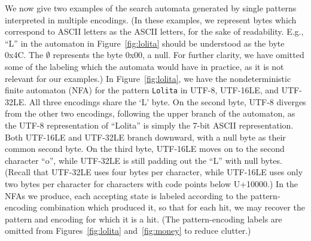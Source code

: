\documentclass[5p,final,number,sort&compress]{elsarticle}
\newcommand{\re}[1]{\texttt{#1}}
\begin{document}
We now give two examples of the search automata generated by single patterns interpreted in multiple encodings. (In these examples, we represent bytes which correspond to ASCII letters as the ASCII letters, for the sake of readability. E.g., ``L'' in the automaton in Figure~\ref{fig:lolita} should be understood as the byte 0x4C. The $\emptyset$ represents the byte 0x00, a null. For further clarity, we have omitted some of the labeling which the automata would have in practice, as it is not relevant for our examples.) In Figure~\ref{fig:lolita}, we have the nondeterministic finite automaton (NFA) for the pattern \re{Lolita} in UTF-8, UTF-16LE, and UTF-32LE. All three encodings share the `L' byte. On the second byte, UTF-8 diverges from the other two encodings, following the upper branch of the automaton, as the UTF-8 representation of ``Lolita'' is simply the 7-bit ASCII representation. Both UTF-16LE and UTF-32LE branch downward, with a null byte as their common second byte. On the third byte, UTF-16LE moves on to the second character ``o'', while UTF-32LE is still padding out the ``L'' with null bytes. (Recall that UTF-32LE uses four bytes per character, while UTF-16LE uses only two bytes per character for characters with code points below U+10000.) In the NFAs we produce, each accepting state is labeled according to the pattern-encoding combination which produced it, so that for each hit, we may recover the pattern and encoding for which it is a hit. (The pattern-encoding labels are omitted from Figures~\ref{fig:lolita} and~\ref{fig:money} to reduce clutter.)
\end{document}
